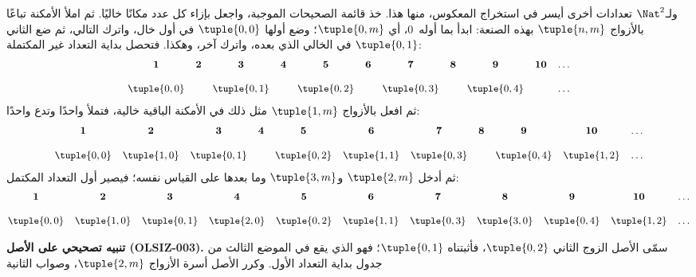 \documentclass[../../../include/open-logic-section]{subfiles}
\begin{document}


\begin{explain}
ولـ$\Nat^2$ تعدادات أخرى أيسر في استخراج المعكوس، منها هذا.
خذ قائمة الصحيحات الموجبة، واجعل بإزاء كل عدد مكانًا خاليًا.
ثم املأ الأمكنة تباعًا بالأزواج $\tuple{n,m}$ بهذه الصنعة:
ابدأ بما أوله~$0$، أي $\tuple{0,m}$؛ وضع أولها $\tuple{0,0}$
في أول خال، واترك التالي، ثم ضع الثاني $\tuple{0,1}$ في الخالي
الذي بعده، واترك آخر، وهكذا. فتحصل بداية التعداد غير المكتملة:
\[\small
\begin{array}{@{}c c c c c c c c c c c@{}}
\mathbf 1 & \mathbf 2 & \mathbf 3 & \mathbf 4 & \mathbf 5 & \mathbf 6 & \mathbf 7 & \mathbf 8 & \mathbf 9 & \mathbf{10} & \dots \\ \\
\tuple{0,0} &  & \tuple{0,1} &  & \tuple{0,2} &  & \tuple{0,3} & & \tuple{0,4} &  & \dots \\
\end{array}
\]
ثم افعل بالأزواج $\tuple{1,m}$ مثل ذلك في الأمكنة الباقية خالية،
فتملأ واحدًا وتدع واحدًا:
\[\small
\begin{array}{@{}c c c c c c c c c c c@{}}
\mathbf 1 & \mathbf 2 & \mathbf 3 & \mathbf 4 & \mathbf 5 & \mathbf 6 & \mathbf 7 & \mathbf 8 & \mathbf 9 & \mathbf{10} & \dots \\ \\
\tuple{0,0} & \tuple{1,0} & \tuple{0,1} &  & \tuple{0,2} & \tuple{1,1} &
\tuple{0,3} & & \tuple{0,4} &  \tuple{1,2} & \dots \\
\end{array}
\]
ثم أدخل $\tuple{2,m}$ و$\tuple{3,m}$ وما بعدها على القياس نفسه؛
فيصير أول التعداد المكتمل:
\[\small
\begin{array}{@{}cc c c c c c c c c c@{}}
\mathbf 1 & \mathbf 2 & \mathbf 3 & \mathbf 4 & \mathbf 5 & \mathbf 6 & \mathbf 7 & \mathbf 8 & \mathbf 9 & \mathbf{10} & \dots \\ \\
\tuple{0,0} & \tuple{1,0} & \tuple{0,1} & \tuple{2,0}  & \tuple{0,2} &
\tuple{1,1} & \tuple{0,3} & \tuple{3,0}  & \tuple{0,4} &  \tuple{1,2} & \dots \\
\end{array}
\]
\begin{editorial}
\textbf{تنبيه تصحيحي على الأصل (OLSIZ-003).}
سمّى الأصل الزوج الثاني $\tuple{0,2}$، فأثبتناه $\tuple{0,1}$؛
فهو الذي يقع في الموضع الثالث من جدول بداية التعداد الأول.
وكرر الأصل أسرة الأزواج $\tuple{2,m}$، وصواب الثانية

\end{editorial}
\end{explain}
\end{document}
